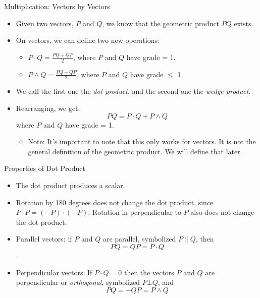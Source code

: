 \documentclass[aspectratio=169,xcolor=dvipsnames]{beamer}
\begin{document}

\begin{frame}{Multiplication: Vectors by Vectors}

\begin{itemize}
      \item Given two vectors, $P$ and $Q$, we know that the geometric product $PQ$
            exists.
      \item On vectors, we can define two new operations:
            \begin{itemize}
                  \item $P\cdot Q = \frac{PQ + QP}{2}$, where $P$ and $Q$ have grade = 1. \medskip
                  \item $P \land Q = \frac{PQ - QP}{2}$, where $P$ and $Q$ have grade $\leq$ 1.
            \end{itemize}
      \item We call the first one the \textit{dot product}, and the second one the 
            \textit{wedge product}.
      \item Rearranging, we get:
            $$PQ = P\cdot Q + P\land Q$$ where $P$ and $Q$ have grade = 1.
            \begin{itemize}
                  \item Note: It's important to note that this only works for vectors. 
                        It is not the general definition of the geometric product.
                        We will define that later.
            \end{itemize}
\end{itemize}
\end{frame}
      



\begin{frame}{Properties of Dot Product}

\begin{itemize}
      \item The dot product produces a scalar.
      \item Rotation by 180 degrees does not change the dot product, since 
            $P\cdot P = (-P) \cdot (-P)$. Rotation in perpendicular to $P$
            also does not change the dot product.
      \item Parallel vectors: if $P$ and $Q$ are parallel, symbolized $P \| Q$,
            then $$PQ = QP = P \cdot Q$$.
      \item Perpendicular vectors: If $P\cdot Q = 0$ then the vectors $P$ and $Q$ are
            perpendicular or \textit{orthogonal}, symbolized $P \bot Q$, and 
            $$PQ = -QP = P \land Q$$
\end{itemize}
\end{frame}
      
\end{document}
